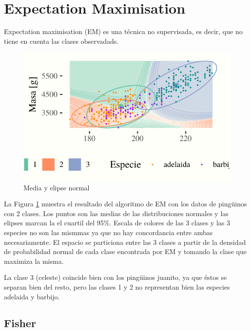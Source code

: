 \documentclass[]{tufte-handout}
\begin{document}
\hypertarget{expectation-maximisation}{%
\section{Expectation Maximisation}\label{expectation-maximisation}}

Expectation maximisation (EM) es una técnica no supervisada, es decir, que no tiene en cuenta las clases observadads.

\begin{figure}
\includegraphics{TP-Labo-2_files/figure-latex/em-pinguinos-1} \caption[Media y elipse normal ]{Media y elipse normal }\label{fig:em-pinguinos}
\end{figure}

La Figura \ref{fig:em-pinguinos} muestra el resultado del algoritmo de EM con los datos de pingüinos con 2 clases. Los puntos son las medias de las distribuciones normales y las elipses marcan la el cuartil del 95\%. Escala de colores de las 3 clases y las 3 especies no son las mismmas ya que no hay concordancia entre ambas necesariamente. El espacio se particiona entre las 3 clases a partir de la densidad de probabilidad normal de cada clase encontrada por EM y tomando la clase que maximiza la misma.

La clase 3 (celeste) coincide bien con los pingüinos juanito, ya que éstos se separan bien del resto, pero las clases 1 y 2 no representan bien las especies adelaida y barbijo.

\hypertarget{fisher}{%
\subsection{Fisher}\label{fisher}}
\end{document}
